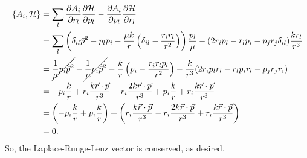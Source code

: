 \documentclass{article}
\theoremstyle{definition}
\newcommand{\p}{\partial}
\newcommand{\ham}{\mathcal{H}}
\newcommand{\f}[2]{\frac{#1}{#2}}
\newcommand{\lp}{\left(}
\newcommand{\rp}{\right)}
\begin{document}
\begin{enumerate}[label=(\alph*)]
	\begin{align*}
	\{ A_i , \ham \} &= \sum_l \f{\p A_i}{\p r_l}\f{\p \ham}{\p p_l} - \f{\p A_i}{\p p_l}\f{\p \ham}{\p r_l} \\
	&= \sum_l   \lp \delta_{il} \vec{p}^2 - p_l p_i - \f{\mu k}{r} \lp \delta_{il} - \f{r_ir_l}{r^2} \rp  \rp \f{p_l}{\mu} - (2 r_i p_l - r_lp_i - p_j r_j \delta_{il})\f{kr_l}{r^3} \\
	&= \cancel{\f{1}{\mu}p_i \vec{p}^2}  -\cancel{\f{1}{\mu} p_i \vec{p}^2} - \f{k }{r}\lp p_i - \f{r_i r_l p_l}{r^2}  \rp  
	- \f{k}{r^3}(2r_ip_lr_l - r_l p_i r_l - p_jr_j r_i)\\
	&= -p_i\f{k}{r} + r_i\f{k\vec{r}\cdot \vec{p}}{r^3} - r_i\f{2k \vec{r}\cdot \vec{p}}{r^3} + p_i \f{k}{r} + r_i\f{k \vec{r}\cdot \vec{p}}{r^3} \\
	&= \lp -p_i\f{k}{r} + p_i \f{k}{r} \rp + \lp r_i\f{k\vec{r}\cdot \vec{p}}{r^3} - r_i\f{2k \vec{r}\cdot \vec{p}}{r^3} +  r_i\f{k \vec{r}\cdot \vec{p}}{r^3} \rp \\
	&= 0.
	\end{align*}
	So, the Laplace-Runge-Lenz vector is conserved, as desired. 
	
	
	

\end{enumerate}
\end{document}
